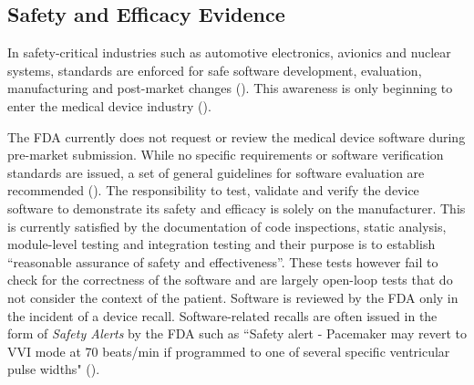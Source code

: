 
\subsection{Safety and Efficacy Evidence}
In safety-critical industries such as automotive electronics, avionics and nuclear systems, standards are enforced for safe software development, evaluation, manufacturing and post-market changes (\cite{autosar,avsi}). This awareness is only beginning to enter the medical device industry (\cite{formal_fda}). 

The FDA currently does not request or review the medical device software during pre-market submission. While no specific requirements or software verification standards are issued, a set of general guidelines for software evaluation are recommended (\cite{fda1, fda2, fda3}). The responsibility to test, validate and verify the device software to demonstrate its safety and efficacy is solely on the manufacturer. This is currently satisfied by the documentation of code inspections, static analysis, module-level testing and integration testing and their purpose is to establish ``reasonable assurance of safety and effectiveness''. These tests however fail to check for the correctness of the software and are largely open-loop tests that do not consider the context of the patient. Software is reviewed by the FDA only in the incident of a device recall. Software-related recalls are often issued in the form of \emph{Safety Alerts} by the %
FDA such as ``Safety alert - Pacemaker may revert to VVI mode at 70 beats/min if programmed to one of several specific ventricular pulse widths" (\cite{medstats}).


